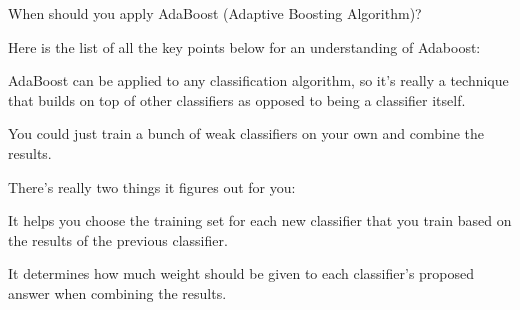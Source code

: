     \begin{qanda}
		\begin{question}
When should you apply AdaBoost (Adaptive Boosting Algorithm)?
		\end{question}

		\begin{answer}Here is the list of all the key points below for an understanding of Adaboost:
			\begin{bulletedlist}
				\item AdaBoost can be applied to any classification algorithm, so it's really a technique that builds on top of other classifiers as opposed to being a classifier itself.
				\item You could just train a bunch of weak classifiers on your own and combine the results.
				\item There's really two things it figures out for you:
				\begin{bulletedlist}
					\item It helps you choose the training set for each new classifier that you train based on the results of the previous classifier.
					\item It determines how much weight should be given to each classifier's proposed answer when combining the results.
				\end{bulletedlist}
			\end{bulletedlist}
		\end{answer}
  \end{qanda}

